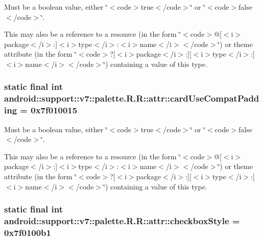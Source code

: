 Must be a boolean value, either \char`\"{}$<$code$>$true$<$/code$>$\char`\"{} or \char`\"{}$<$code$>$false$<$/code$>$\char`\"{}. 

This may also be a reference to a resource (in the form \char`\"{}$<$code$>$@\mbox{[}$<$i$>$package$<$/i$>$:\mbox{]}$<$i$>$type$<$/i$>$:$<$i$>$name$<$/i$>$$<$/code$>$\char`\"{}) or theme attribute (in the form \char`\"{}$<$code$>$?\mbox{[}$<$i$>$package$<$/i$>$:\mbox{]}\mbox{[}$<$i$>$type$<$/i$>$:\mbox{]}$<$i$>$name$<$/i$>$$<$/code$>$\char`\"{}) containing a value of this type. \hypertarget{classandroid_1_1support_1_1v7_1_1palette_1_1_r_1_1attr_45fe1f7efb574e31c1ae0adbe5297699}{
\subsubsection[{cardUseCompatPadding}]{\setlength{\rightskip}{0pt plus 5cm}static final int android::support::v7::palette.R.R::attr::cardUseCompatPadding = 0x7f010015}}
\label{classandroid_1_1support_1_1v7_1_1palette_1_1_r_1_1attr_45fe1f7efb574e31c1ae0adbe5297699}


Must be a boolean value, either \char`\"{}$<$code$>$true$<$/code$>$\char`\"{} or \char`\"{}$<$code$>$false$<$/code$>$\char`\"{}. 

This may also be a reference to a resource (in the form \char`\"{}$<$code$>$@\mbox{[}$<$i$>$package$<$/i$>$:\mbox{]}$<$i$>$type$<$/i$>$:$<$i$>$name$<$/i$>$$<$/code$>$\char`\"{}) or theme attribute (in the form \char`\"{}$<$code$>$?\mbox{[}$<$i$>$package$<$/i$>$:\mbox{]}\mbox{[}$<$i$>$type$<$/i$>$:\mbox{]}$<$i$>$name$<$/i$>$$<$/code$>$\char`\"{}) containing a value of this type. \hypertarget{classandroid_1_1support_1_1v7_1_1palette_1_1_r_1_1attr_5cf4babc984c02547b9ff6c02aec8572}{
\subsubsection[{checkboxStyle}]{\setlength{\rightskip}{0pt plus 5cm}static final int android::support::v7::palette.R.R::attr::checkboxStyle = 0x7f0100b1}}
\label{classandroid_1_1support_1_1v7_1_1palette_1_1_r_1_1attr_5cf4babc984c02547b9ff6c02aec8572}


